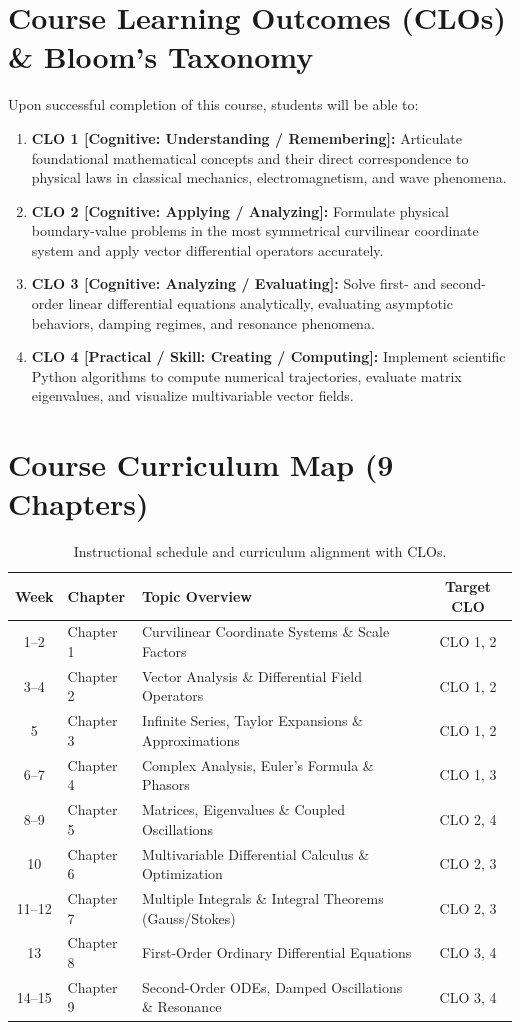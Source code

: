 \section*{Course Learning Outcomes (CLOs) \& Bloom's Taxonomy}
Upon successful completion of this course, students will be able to:
\begin{enumerate}
    \item \textbf{CLO 1 [Cognitive: Understanding / Remembering]:} Articulate foundational mathematical concepts and their direct correspondence to physical laws in classical mechanics, electromagnetism, and wave phenomena.
    \item \textbf{CLO 2 [Cognitive: Applying / Analyzing]:} Formulate physical boundary-value problems in the most symmetrical curvilinear coordinate system and apply vector differential operators accurately.
    \item \textbf{CLO 3 [Cognitive: Analyzing / Evaluating]:} Solve first- and second-order linear differential equations analytically, evaluating asymptotic behaviors, damping regimes, and resonance phenomena.
    \item \textbf{CLO 4 [Practical / Skill: Creating / Computing]:} Implement scientific Python algorithms to compute numerical trajectories, evaluate matrix eigenvalues, and visualize multivariable vector fields.
\end{enumerate}

\section*{Course Curriculum Map (9 Chapters)}
\begin{table}[H]
\centering
\small
\begin{tabularx}{\textwidth}{clp{7.5cm}c}
\toprule
\textbf{Week} & \textbf{Chapter} & \textbf{Topic Overview} & \textbf{Target CLO} \\
\midrule
1--2 & Chapter 1 & Curvilinear Coordinate Systems \& Scale Factors & CLO 1, 2 \\
3--4 & Chapter 2 & Vector Analysis \& Differential Field Operators & CLO 1, 2 \\
5 & Chapter 3 & Infinite Series, Taylor Expansions \& Approximations & CLO 1, 2 \\
6--7 & Chapter 4 & Complex Analysis, Euler's Formula \& Phasors & CLO 1, 3 \\
8--9 & Chapter 5 & Matrices, Eigenvalues \& Coupled Oscillations & CLO 2, 4 \\
10 & Chapter 6 & Multivariable Differential Calculus \& Optimization & CLO 2, 3 \\
11--12 & Chapter 7 & Multiple Integrals \& Integral Theorems (Gauss/Stokes) & CLO 2, 3 \\
13 & Chapter 8 & First-Order Ordinary Differential Equations & CLO 3, 4 \\
14--15 & Chapter 9 & Second-Order ODEs, Damped Oscillations \& Resonance & CLO 3, 4 \\
\bottomrule
\end{tabularx}
\caption{Instructional schedule and curriculum alignment with CLOs.}
\label{tab:syllabus_map}
\end{table}

